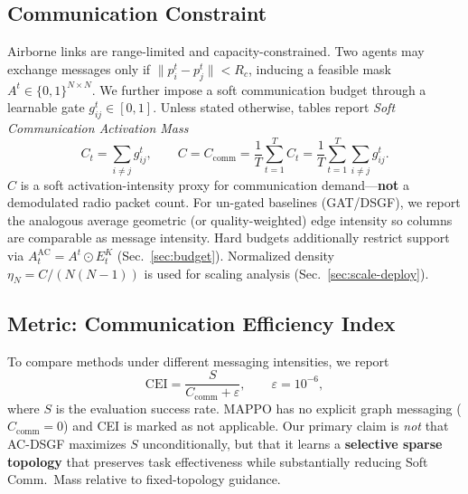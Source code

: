 \subsection{Communication Constraint}
Airborne links are range-limited and capacity-constrained.
Two agents may exchange messages only if
$\|p_i^{t}-p_j^{t}\|<R_c$, inducing a feasible mask
$A^{t}\in\{0,1\}^{N\times N}$.
We further impose a soft communication budget through a learnable gate
$g_{ij}^{t}\in[0,1]$.
Unless stated otherwise, tables report \emph{Soft Communication Activation Mass}
\begin{equation}
C_t
=
\sum_{i\neq j}
g_{ij}^{t},
\qquad
C
=
C_{\mathrm{comm}}
=
\frac{1}{T}
\sum_{t=1}^{T}
C_t
=
\frac{1}{T}
\sum_{t=1}^{T}
\sum_{i\neq j}
g_{ij}^{t}.
\label{eq:comm-cost}
\end{equation}
$C$ is a soft activation-intensity proxy for communication demand---\textbf{not}
a demodulated radio packet count.
For un-gated baselines (GAT/DSGF), we report the analogous average geometric
(or quality-weighted) edge intensity so columns are comparable as message
intensity.
Hard budgets additionally restrict support via
$A_t^{\mathrm{AC}}=A^{t}\odot E_t^{K}$ (Sec.~\ref{sec:budget}).
Normalized density $\eta_N=C/(N(N-1))$ is used for scaling analysis
(Sec.~\ref{sec:scale-deploy}).

\subsection{Metric: Communication Efficiency Index}
To compare methods under different messaging intensities, we report
\begin{equation}
\mathrm{CEI}
=
\frac{S}{C_{\mathrm{comm}}+\varepsilon},
\qquad
\varepsilon=10^{-6},
\label{eq:cei}
\end{equation}
where $S$ is the evaluation success rate.
MAPPO has no explicit graph messaging ($C_{\mathrm{comm}}{=}0$) and CEI is
marked as not applicable.
Our primary claim is \emph{not} that AC-DSGF maximizes $S$ unconditionally,
but that it learns a \textbf{selective sparse topology} that preserves
task effectiveness while substantially reducing Soft Comm.\ Mass relative to
fixed-topology guidance.